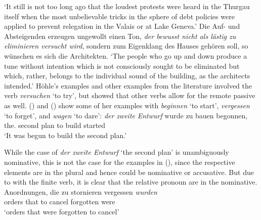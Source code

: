\glt `It still is not too long ago that the loudest protests were heard in the Thurgau itself 
when the most unbelievable tricks in the sphere of debt policies were applied to prevent relegation in the Valais or at Lake Geneva.' 
\ex Die Auf- und Absteigenden erzeugen ungewollt einen Ton, \emph{der bewusst nicht als lästig zu eliminieren versucht wird}, 
    sondern zum Eigenklang des Hauses gehören soll, so wünschen es sich die Architekten.\footnotemark
{}
\glt `The people who go up and down produce a tune without intention which is not consciously sought to
be eliminated but which, rather, belongs to the individual sound of the building, as the
architects intended.'
\zl
Höhle's examples and other examples from the literature involved the verb \emph{versuchen} `to try',
but \citet{Wurmbrand2003a} showed that other verbs allow for the remote passive as well. ()
and () show some of her examples with \emph{beginnen} `to start', \emph{vergessen} `to forget', and
\emph{wagen} `to dare':
\ea
\gll \emph{der} \emph{zweite} \emph{Entwurf} wurde  zu bauen begonnen,\footnotemark\\
     the.\NOM{} second        plan           \AUX{} to build started\\\german
{}
\glt `It was begun to build the second plan.' 
\z

\noindent
While the case of \emph{der zweite Entwurf} `the second plan' is unambiguously nominative, this is
not the case for the examples in (), since the respective elements are in the
plural and hence could be nominative or accusative. But due to  with the finite verb, it is
clear that the relative pronoun are in the nominative.
\eal
\ex 
\gll Anordnungen, die zu stornieren vergessen \emph{wurden}\footnotemark\\
     orders       that to cancel forgotten were\\\german
{}
\glt `orders that were forgotten to cancel'

